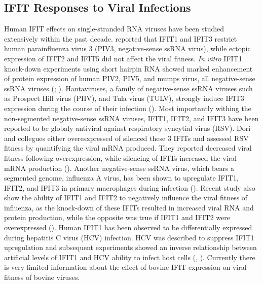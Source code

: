 \subsection{IFIT Responses to Viral Infections} \label{subsec:IFIT Responses to Viral Infections}
Human IFIT effects on single-stranded RNA viruses have been studied extensively within the past decade. \cite{Rabbani2016Identification3} reported that IFIT1 and IFIT3 restrict human parainfluenza virus 3 (PIV3, negative-sense ssRNA virus), while ectopic expression of IFIT2 and IFIT5 did not affect the viral fitness. \textit{In vitro} IFIT1 knock-down experiments using short hairpin RNA showed marked enhancement of protein expression of human PIV2, PIV5, and mumps virus, all negative-sense ssRNA viruses (\cite{Andrejeva2013ISG56/IFIT1Synthesis}; \cite{Young2016HumanFamily}). Hantaviruses, a family of negative-sense ssRNA viruses such as Prospect Hill virus (PHV), and Tula virus (TULV), strongly induce IFIT3 expression during the course of their infection (\cite{Matthys2011TheInduction}). Most importantly withing the non-segmented negative-sense ssRNA viruses, IFIT1, IFIT2, and IFIT3 have been reported to be globaly antiviral against respiratory syncytial virus (RSV). Dori and collegues either overesxpressed of silenced these 3 IFITs and assessed RSV fitness by quantifying the viral mRNA produced. They reported decreased viral fitness following overexpression, while silencing of IFITs increased the viral mRNA production (\cite{Drori2020InfluenzaProteins}). Another negative-sense ssRNA virus, which bears a segmented genome, influenza A virus, has been shown to upregulate IFIT1, IFIT2, and IFIT3 in primary macrophages during infection (\cite{Lietzen2011QuantitativeMacrophages}). Recent study also show the ability of IFIT1 and IFIT2 to negatively influence the viral fitness of influenza, as the knock-down of these IFITs resulted in increased viral RNA and protein production, while the opposite was true if IFIT1 and IFIT2 were overexpressed (\cite{Zhu2023TheSynthesis}). Human IFIT1 has been observed to be differentially expressed during hepatitis C virus (HCV) infection. HCV was described to suppress IFIT1 upregulation and subsequent experiments showed an inverse relationship between artificial levels of IFIT1 and HCV ability to infect host cells (\cite{Raychoudhuri2011ISG56Replication}, \cite{Ishida2019HepaticInfection}). Currently there is very limited information about the effect of bovine IFIT expression on viral fitness of bovine viruses.




